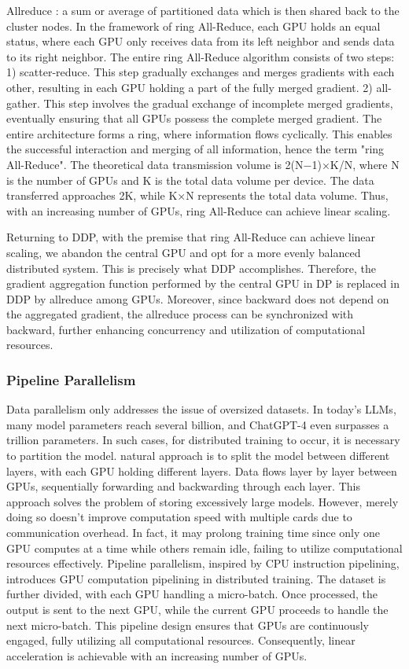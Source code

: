 \documentclass[conference]{IEEEtran}
\begin{document}
Allreduce \cite{b22} : a sum or average of partitioned data which is then shared back to the cluster nodes. In the framework of ring All-Reduce, each GPU holds an equal status, where each GPU only receives data from its left neighbor and sends data to its right neighbor. The entire ring All-Reduce algorithm consists of two steps:
1) scatter-reduce. This step gradually exchanges and merges gradients with each other, resulting in each GPU holding a part of the fully merged gradient. 2) all-gather. This step involves the gradual exchange of incomplete merged gradients, eventually ensuring that all GPUs possess the complete merged gradient.
The entire architecture forms a ring, where information flows cyclically. This enables the successful interaction and merging of all information, hence the term "ring All-Reduce". The theoretical data transmission volume is 2(N−1)×K/N​, where N is the number of GPUs and K is the total data volume per device. The data transferred approaches 2K, while K×N represents the total data volume. Thus, with an increasing number of GPUs, ring All-Reduce can achieve linear scaling.

Returning to DDP, with the premise that ring All-Reduce can achieve linear scaling, we abandon the central GPU and opt for a more evenly balanced distributed system. This is precisely what DDP accomplishes. Therefore, the gradient aggregation function performed by the central GPU in DP is replaced in DDP by allreduce among GPUs. Moreover, since backward does not depend on the aggregated gradient, the allreduce process can be synchronized with backward, further enhancing concurrency and utilization of computational resources.

\subsubsection{Pipeline Parallelism}
Data parallelism only addresses the issue of oversized datasets. In today's LLMs, many model parameters reach several billion, and ChatGPT-4 even surpasses a trillion parameters. In such cases, for distributed training to occur, it is necessary to partition the model.
natural approach is to split the model between different layers, with each GPU holding different layers. Data flows layer by layer between GPUs, sequentially forwarding and backwarding through each layer. This approach solves the problem of storing excessively large models. However, merely doing so doesn't improve computation speed with multiple cards due to communication overhead. In fact, it may prolong training time since only one GPU computes at a time while others remain idle, failing to utilize computational resources effectively.
Pipeline parallelism, inspired by CPU instruction pipelining, introduces GPU computation pipelining in distributed training. The dataset is further divided, with each GPU handling a micro-batch. Once processed, the output is sent to the next GPU, while the current GPU proceeds to handle the next micro-batch. This pipeline design ensures that GPUs are continuously engaged, fully utilizing all computational resources. Consequently, linear acceleration is achievable with an increasing number of GPUs.
\end{document}
